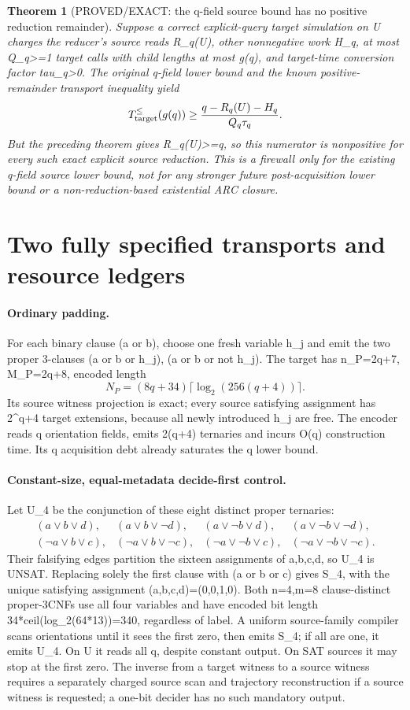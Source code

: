 \documentclass[11pt]{article}
\newtheorem{theorem}{Theorem}
\begin{document}
\begin{theorem}[PROVED/EXACT: the q-field source bound has no positive reduction remainder]
Suppose a correct explicit-query target simulation on U charges the reducer's source reads R_q(U), other nonnegative work H_q, at most Q_q>=1 target calls with child lengths at most g(q), and target-time conversion factor tau_q>0. The original q-field lower bound and the known positive-remainder transport inequality yield
\[
T_{\rm target}^{\le}(g(q))\ge
\frac{q-R_q(U)-H_q}{Q_q\tau_q}.
\]
But the preceding theorem gives R_q(U)>=q, so this numerator is nonpositive for every such exact explicit source reduction. This is a firewall only for the existing q-field source lower bound, not for any stronger future post-acquisition lower bound or a non-reduction-based existential ARC closure.
\end{theorem}

\section{Two fully specified transports and resource ledgers}
\paragraph{Ordinary padding.}
For each binary clause (a or b), choose one fresh variable h_j and emit the two proper 3-clauses (a or b or h_j), (a or b or not h_j). The target has n_P=2q+7, M_P=2q+8, encoded length
\[
N_P=(8q+34)\lceil\log_2(256(q+4))\rceil.
\]
Its source witness projection is exact; every source satisfying assignment has 2^{q+4} target extensions, because all newly introduced h_j are free. The encoder reads q orientation fields, emits 2(q+4) ternaries and incurs O(q) construction time. Its q acquisition debt already saturates the q lower bound.

\paragraph{Constant-size, equal-metadata decide-first control.}
Let U_4 be the conjunction of these eight distinct proper ternaries:
\[
\begin{array}{llll}
(a\vee b\vee d),&(a\vee b\vee\neg d),&
(a\vee\neg b\vee d),&(a\vee\neg b\vee\neg d),\\
(\neg a\vee b\vee c),&(\neg a\vee b\vee\neg c),&
(\neg a\vee\neg b\vee c),&(\neg a\vee\neg b\vee\neg c).
\end{array}
\]
Their falsifying edges partition the sixteen assignments of a,b,c,d, so U_4 is UNSAT. Replacing solely the first clause with (a or b or c) gives S_4, with the unique satisfying assignment (a,b,c,d)=(0,0,1,0). Both n=4,m=8 clause-distinct proper-3CNFs use all four variables and have encoded bit length 34*ceil(log_2(64*13))=340, regardless of label. A uniform source-family compiler scans orientations until it sees the first zero, then emits S_4; if all are one, it emits U_4. On U it reads all q, despite constant output. On SAT sources it may stop at the first zero. The inverse from a target witness to a source witness requires a separately charged source scan and trajectory reconstruction if a source witness is requested; a one-bit decider has no such mandatory output.
\end{document}
